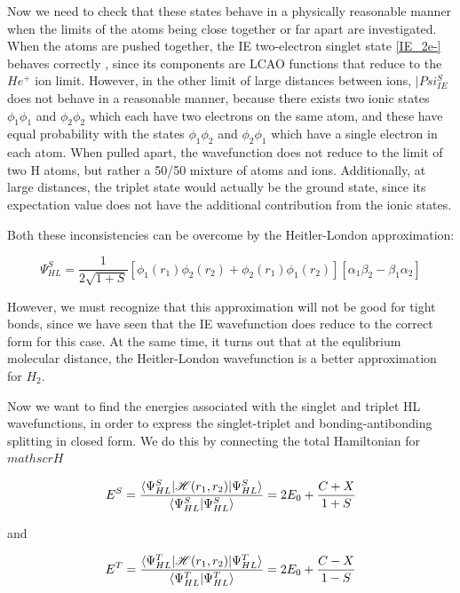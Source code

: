 Now we need to check that these states behave in a physically reasonable manner when the limits of the atoms being close together or far apart are investigated. When the atoms are pushed together, the IE two-electron singlet state \ref{IE_2e-} behaves correctly , since its components are LCAO functions that reduce to the $He^+$ ion limit. However, in the other limit of large distances between ions, $|Psi_{IE}^S$ does not behave in a reasonable manner, because there exists two ionic states $\phi_1\phi_1$ and $\phi_2\phi_2$ which each have two electrons on the same atom, and these have equal probability with the states $\phi_1\phi_2$ and $\phi_2\phi_1$ which have a single electron in each atom. When pulled apart, the wavefunction does not reduce to the limit of two H atoms, but rather a 50/50 mixture of atoms and ions. Additionally, at large distances, the triplet state would actually be the ground state, since its expectation value does not have the additional contribution from the ionic states. 

Both these inconsistencies can be overcome by the Heitler-London approximation:

\begin{equation}
\Psi_{HL}^S = \frac{1}{2\sqrt{1+S}}[\phi_1(r_1)\phi_2(r_2)+\phi_2(r_1)\phi_1(r_2)][\alpha_1\beta_2-\beta_1\alpha_2]
\end{equation}

However, we must recognize that this approximation will not be good for tight bonds, since we have seen that the IE wavefunction does reduce to the correct form for this case. At the same time, it turns out that at the equlibrium molecular distance, the Heitler-London wavefunction is a better approximation for $H_2$.

Now we want to find the energies associated with the singlet and triplet HL wavefunctions, in order to express the singlet-triplet and bonding-antibonding splitting in closed form. We do this by connecting the total Hamiltonian for $mathscr{H}$

\begin{equation}
E^S=\frac{\braket{\Psi_{HL}^S|\mathscr{H}(r_1,r_2)|\Psi_{HL}^S}}{\braket{\Psi_{HL}^S|\Psi_{HL}^S}}
= 2E_0+\frac{C+X}{1+S}
\end{equation}

and

\begin{equation}
E^T=\frac{\braket{\Psi_{HL}^T|\mathscr{H}(r_1,r_2)|\Psi_{HL}^T}}{\braket{\Psi_{HL}^T|\Psi_{HL}^T}}
= 2E_0+\frac{C-X}{1-S}
\label{HLenSin}
\end{equation}

